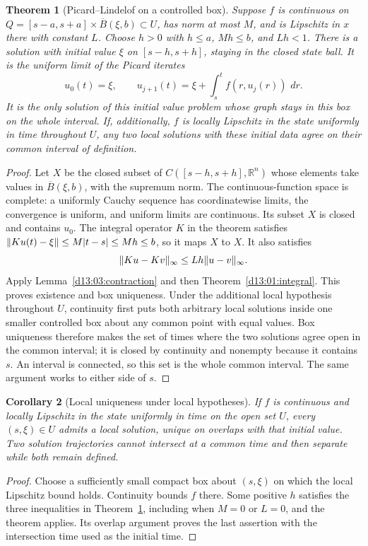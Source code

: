 \documentclass[11pt,oneside]{book}
\newtheorem{theorem}{Theorem}[chapter]
\newtheorem{corollary}[theorem]{Corollary}
\theoremstyle{definition}
\theoremstyle{remark}\newtheorem{remark}[theorem]{Remark}
\newcommand{\R}{\mathbb R}\newcommand{\C}{\mathbb C}
\newcommand{\dd}{\,d}\newcommand{\id}{\operatorname{id}}
\begin{document}
\begin{theorem}[Picard--Lindelof on a controlled box]\label{d13:03:picard}
Suppose $f$ is continuous on
$Q=[s-a,s+a]\times\overline B(\xi,b)\subset U$, has norm at most
$M$, and is Lipschitz in $x$ there with constant $L$. Choose $h>0$
with $h\leq a$, $Mh\leq b$, and $Lh<1$. There is a solution with
initial value $\xi$ on $[s-h,s+h]$, staying in the closed state ball.
It is the uniform limit of the Picard iterates
\[
 u_0(t)=\xi,\qquad
 u_{j+1}(t)=\xi+\int_s^t f(r,u_j(r))\,\dd r.
\]
It is the only solution of this initial value problem whose graph stays
in this box on the whole interval. If, additionally, $f$ is locally
Lipschitz in the state uniformly in time throughout $U$, any two local
solutions with these initial data agree on their common interval of definition.
\end{theorem}
\begin{proof}
Let $X$ be the closed subset of $C([s-h,s+h],\R^n)$ whose elements
take values in $\overline B(\xi,b)$, with the supremum norm. The
continuous-function space is complete: a uniformly Cauchy sequence has
coordinatewise limits, the convergence is uniform, and uniform limits
are continuous. Its subset $X$ is closed and contains $u_0$.
The integral operator $K$ in the theorem satisfies
$\lVert Ku(t)-\xi\rVert\leq M|t-s|\leq Mh\leq b$, so it maps $X$ to $X$.
It also satisfies
\[
 \lVert Ku-Kv\rVert_\infty\leq Lh\lVert u-v\rVert_\infty.
\]
Apply Lemma~\ref{d13:03:contraction} and then
Theorem~\ref{d13:01:integral}. This proves existence and box uniqueness.
Under the additional local hypothesis throughout $U$, continuity first puts
both arbitrary local solutions inside one
smaller controlled box about any common point with equal values. Box
uniqueness therefore makes the set of times where the two solutions
agree open in the common interval; it is closed by continuity and
nonempty because it contains $s$. An interval is connected, so this set
is the whole common interval. The same argument works to either side of
$s$.
\end{proof}

\begin{corollary}[Local uniqueness under local hypotheses]\label{d13:03:uniqueness}
If $f$ is continuous and locally Lipschitz in the state uniformly in
time on the open set $U$, every $(s,\xi)\in U$ admits a local solution,
unique on overlaps with that initial value. Two solution trajectories
cannot intersect at a common time and then separate while both remain
defined.
\end{corollary}
\begin{proof}
Choose a sufficiently small compact box about $(s,\xi)$ on which the
local Lipschitz bound holds. Continuity bounds $f$ there. Some positive
$h$ satisfies the three inequalities in
Theorem~\ref{d13:03:picard}, including when $M=0$ or $L=0$, and the
theorem applies. Its overlap argument proves the last assertion with
the intersection time used as the initial time.
\end{proof}
\end{document}
